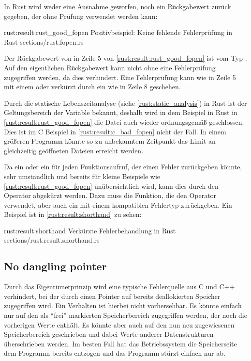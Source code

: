 In Rust wird weder eine Ausnahme geworfen, noch ein Rückgabewert zurück gegeben, der ohne Prüfung verwendet werden kann:

\rustcinclude
	{rust:result:rust_good_fopen}
	{Positivbeispiel: Keine fehlende Fehlerprüfung in Rust}
	{sections/rust.fopen.rs}

Der Rückgabewert von  in Zeile 5 von \autoref{rust:result:rust_good_fopen} ist vom Typ .
Auf den eigentlichen Rückgabewert  kann nicht ohne eine Fehlerprüfung zugegriffen werden, da dies  verhindert.
Eine Fehlerprüfung kann wie in Zeile 5 mit einem  oder verkürzt durch ein  wie in Zeile 8 geschehen.

Durch die statische Lebenszeitanalyse (siehe \autoref{rust:static_analysis}) in Rust ist der Geltungsbereich der  Variable bekannt, deshalb wird in dem Beispiel in Rust in \autoref{rust:result:rust_good_fopen} die Datei auch wieder ordnungsgemäß geschlossen.
Dies ist im C Beispiel in \autoref{rust:result:c_bad_fopen} nicht der Fall.
In einem größeren Programm könnte so zu unbekanntem Zeitpunkt das Limit an gleichzeitig geöffneten Dateien erreicht werden.

Da ein  oder ein  für jeden Funktionsaufruf, der einen Fehler zurückgeben könnte, sehr umständlich und bereits für kleine Beispiele wie \autoref{rust:result:rust_good_fopen} unübersichtlich wird, kann dies durch den Operator  abgekürzt werden.
Dazu muss die Funktion, die den Operator verwendet, aber auch ein  mit einem kompatiblen Fehlertyp zurückgeben.
Ein Beispiel ist in \autoref{rust:result:shorthand} zu sehen:

\rustcinclude
	{rust:result:shorthand}
	{Verkürzte Fehlerbehandlung in Rust}
	{sections/rust.result.shorthand.rs}



\subsection{No dangling pointer}
\label{rust:guarantee:no_dangling_pointer}

Durch das Eigentümerprinzip wird eine typische Fehlerquelle aus C und C++ verhindert, bei der durch einen Pointer auf bereits deallokierten Speicher zugegriffen wird.
Ein Verhalten ist hierbei nicht vorhersehbar. Es könnte einfach nur auf den als \enquote{frei} markierten Speicherbereich zugegriffen werden, der noch die vorherigen Werte enthält.
Es könnte aber auch auf den nun neu zugewiesenen Speicherbereich geschrieben und dabei Werte anderer Datenstrukturen überschrieben werden.
Im besten Fall hat das Betriebssystem die Speicherseite dem Programm bereits entzogen und das Programm stürzt einfach nur ab.

